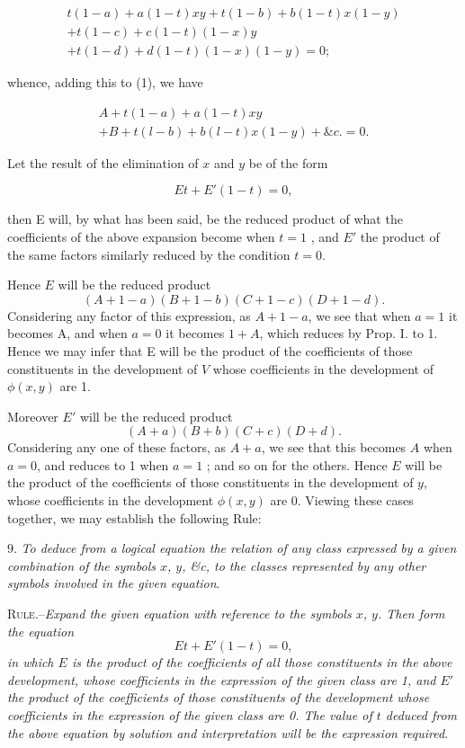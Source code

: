 \documentclass[oneside]{book}
\begin{document}
\begin{eqnarray*}
{t(1 -a ) + a (1 - t)} xy + {t(1 - b) + b(1 - t)} x(1 - y) \\
+ {t(1-c) + c(1-t)} (1-x)y\\
+ {t(1-d) + d(1-t)} (1-x) (1-y) = 0;
\end{eqnarray*}

whence, adding this to (1), we have

\begin{eqnarray*}
{A + t(1-a) + a(1-t)}xy\\
+ {B + t(l-b) + b(l-t)} x(1-y) + \&c. = 0.
\end{eqnarray*}

Let the result of the elimination of $x$ and $y$ be of the form

\[
Et+E' (1-t)=0,
\]

then E will, by what has been said, be the reduced product of
what the coefficients of the above expansion become when $t = 1$ ,
and $E'$ the product of the same factors similarly reduced by the
condition $t = 0$.

Hence $E$ will be the reduced product
\[
(A+1-a)(B+1-b)(C+1-c)(D+1-d).
\]
Considering any factor of this expression, as $A + 1 - a$, we see
that when $a = 1$ it becomes A, and when $a = 0$ it becomes $1 + A$,
which reduces by Prop. I. to 1. Hence we may infer that E will
be the product of the coefficients of those constituents in the
development of $V$ whose coefficients in the development of $\phi (x, y)$
are 1.

Moreover $E'$ will be the reduced product
\[
(A+a)(B+b)(C+c)(D+d).
\]
Considering any one of these factors, as $A + a$, we see that this
becomes $A$ when $a = 0$, and reduces to 1 when $a = 1$ ; and so on
for the others. Hence $E$ will be the product of the coefficients
of those constituents in the development of $y$, whose coefficients
in the development $\phi (x, y)$ are 0. Viewing these cases together,
we may establish the following Rule:

9. \textit{To deduce from a logical equation the relation of any class
expressed by a given combination of the symbols $x$, $y$, \&c, to the
classes represented by any other symbols involved in the given
equation}.

\textsc{Rule}.--\textit{Expand the given equation with reference to the symbols $x$, $y$. Then form the equation
\[
Et + E'(1-t) = 0,
\]
in which $E$ is the product of the coefficients of all those constituents
in the above development, whose coefficients in the expression of the
given class are 1, and $E'$ the product of the coefficients of those constituents of the development whose coefficients in the expression of the
given class are 0. The value of $t$ deduced from the above equation
by solution and interpretation will be the expression required}.
\end{document}
